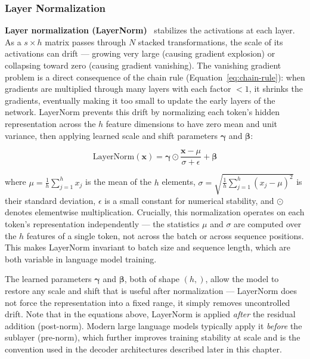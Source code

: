 \documentclass{book}
\begin{document}
\subsubsection*{Layer Normalization}

\textbf{Layer normalization (LayerNorm)}~\cite{ba2016layernorm} stabilizes the
activations at each layer. As a $s \times h$ matrix  passes through $N$ stacked
transformations, the scale of its activations can drift --- growing very large
(causing gradient explosion) or collapsing toward zero (causing gradient
vanishing). The vanishing gradient problem is a direct consequence of the chain
rule (Equation~\ref{eq:chain-rule}): when gradients are multiplied through
many layers with each factor $ < 1 $, it shrinks the gradients, eventually making
it too small to update the early layers of the network. LayerNorm prevents this
drift by normalizing each token's hidden representation across the $h$ feature
dimensions to have zero mean and unit variance, then applying learned scale and
shift parameters $\boldsymbol{\gamma}$ and $\boldsymbol{\beta}$:

\begin{equation}
\text{LayerNorm}(\mathbf{x}) =
    \boldsymbol{\gamma} \odot
    \frac{\mathbf{x} - \mu}{\sigma + \epsilon}
    + \boldsymbol{\beta}
\end{equation}

where $\mu = \frac{1}{h}\sum_{j=1}^{h} x_j$ is the mean of the $h$ elements,
$\sigma = \sqrt{\frac{1}{h}\sum_{j=1}^{h}(x_j - \mu)^2}$ is their standard
deviation, $\epsilon$ is a small constant for numerical stability, and
$\odot$ denotes elementwise multiplication. Crucially, this normalization
operates on each token's representation independently --- the statistics
$\mu$ and $\sigma$ are computed over the $h$ features of a single token,
not across the batch or across sequence positions. This makes LayerNorm
invariant to batch size and sequence length, which are both variable in
language model training.

The learned parameters $\boldsymbol{\gamma}$ and $\boldsymbol{\beta}$, both
of shape $(h,)$, allow the model to restore any scale and shift that is
useful after normalization --- LayerNorm does not force the representation into
a fixed range, it simply removes uncontrolled drift. Note that in the equations
above, LayerNorm is applied \emph{after} the residual addition (post-norm).
Modern large language models typically apply it \emph{before} the sublayer
(pre-norm), which further improves training stability at scale and is the
convention used in the decoder architectures described later in this chapter.
\end{document}
